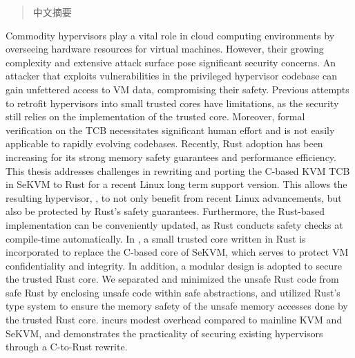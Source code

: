 
\begin{abstract}

中文摘要

\end{abstract}

\begin{abstract*}

Commodity hypervisors play a vital role in cloud computing environments by
overseeing hardware resources for virtual machines. However, their growing
complexity and extensive attack surface pose significant security concerns.
An attacker that exploits vulnerabilities in the privileged hypervisor
codebase can gain unfettered access to VM data, compromising their safety.
Previous attempts to retrofit hypervisors into small trusted cores have
limitations, as the security still relies on the implementation of the trusted
core. Moreover, formal verification on the TCB necessitates significant human
effort and is not easily applicable to rapidly evolving codebases.
Recently, Rust adoption has been increasing for its strong memory safety
guarantees and performance efficiency.
This thesis addresses challenges in rewriting and porting the C-based KVM TCB
in SeKVM to Rust for a recent Linux long term support version. This allows the
resulting hypervisor, \rustsec{}, to not only benefit from recent Linux
advancements, but also be protected by Rust's safety guarantees.
Furthermore, the Rust-based implementation can be conveniently updated,
as Rust conducts safety checks at compile-time automatically.
In \rustsec{}, a small trusted core written in Rust is incorporated to replace
the C-based core of SeKVM, which serves to protect VM confidentiality and
integrity.
In addition,
a modular design is adopted to secure the trusted Rust core. We separated and
minimized the unsafe Rust code from safe Rust by enclosing unsafe code within
safe abstractions, and utilized Rust's type system to ensure the memory safety
of the unsafe memory accesses done by the trusted Rust core.
\rustsec{} incurs modest overhead compared to mainline KVM and SeKVM, and
demonstrates the practicality of securing existing hypervisors through a
C-to-Rust rewrite.

\end{abstract*}
